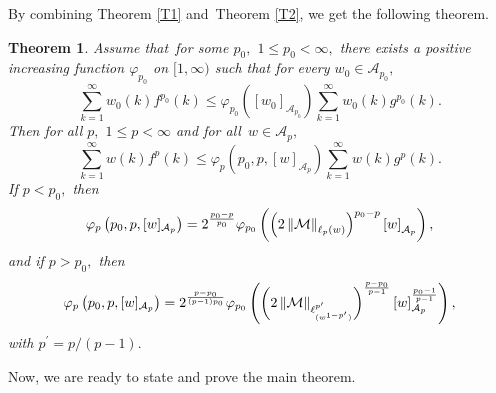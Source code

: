 \documentclass[a4paper]{amsart}
\theoremstyle{plain}
\newtheorem{theorem}{Theorem}[section]
\numberwithin{equation}{section}
\begin{document}
By combining Theorem \ref{T1} and\ Theorem \ref{T2}, we get the following
theorem.

\begin{theorem}
\label{T3}Assume that\ for some $p_{0},$ $1\leq p_{0}<\infty ,$ there exists
a positive increasing function $\mathcal{\varphi }_{p_{0}}$ on $[1,\infty )$
such that for every $w_{0}\in \mathcal{A}_{p_{0}},$%
\begin{equation}
\sum_{k=1}^{\infty }w_{0}(k)f^{p_{0}}(k)\leq \mathcal{\varphi }%
_{p_{0}}\left( [w_{0}]_{\mathcal{A}_{p_{0}}}\right) \sum_{k=1}^{\infty
}w_{0}(k)g^{p_{0}}(k).  \label{3,2}
\end{equation}%
Then for all $p,$ $1\leq p<\infty $ and for all\ $w\in \mathcal{A}_{p},$%
\begin{equation*}
\sum_{k=1}^{\infty }w(k)f^{p}(k)\leq \mathcal{\varphi }_{p}\left(
p_{0},p,[w]_{\mathcal{A}_{p}}\right) \sum_{k=1}^{\infty }w(k)g^{p}(k).
\end{equation*}%
If $p<p_{0},$ then 
\begin{equation*}
\mathcal{\varphi }_{p}\left( p_{0},p,[w]_{\mathcal{A}_{p}}\right) =2^{\frac{%
p_{0}-p}{p_{0}}}\mathcal{\varphi }_{p_{0}}\left( \left( 2\left\Vert \mathcal{%
M}\right\Vert _{\ell _{p}(w)}\right) ^{p_{0}-p}\left[ w\right] _{\mathcal{A}%
_{p}}\right) ,
\end{equation*}%
and if $p>p_{0},$ then 
\begin{equation*}
\mathcal{\varphi }_{p}\left( p_{0},p,[w]_{\mathcal{A}_{p}}\right) =2^{\frac{%
p-p_{0}}{\left( p-1\right) p_{0}}}\mathcal{\varphi }_{p_{0}}\left( \left(
2\left\Vert \mathcal{M}\right\Vert _{\ell _{(w^{1-p^{\prime }})}^{p^{\prime
}}}\right) ^{\frac{p-p_{0}}{p-1}}\left[ w\right] _{\mathcal{A}_{p}}^{\frac{%
p_{0}-1}{p-1}}\right) ,
\end{equation*}%
with $p^{\prime }=p/\left( p-1\right) .$
\end{theorem}

Now, we are ready to state and prove the main theorem.
\end{document}
